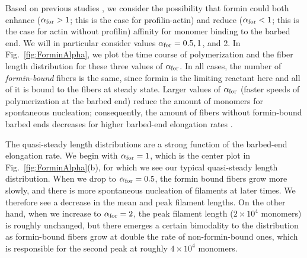 \documentclass[11pt]{article}
\begin{document}
Based on previous studies \cite{zweifel2021nucleation, funk2019profilin}, we consider the possibility that formin could both enhance ($\alpha_\text{for} > 1$; this is the case for profilin-actin) and reduce ($\alpha_\text{for} < 1$; this is the case for actin without profilin) affinity for monomer binding to the barbed end. We will in particular consider values $\alpha_\text{for}=0.5, 1$, and 2. In Fig.\ \ref{fig:ForminAlpha}, we plot the time course of polymerization and the fiber length distribution for these three values of $\alpha_\text{for}$. In all cases, the number of \emph{formin-bound} fibers is the same, since formin is the limiting reactant here and all of it is bound to the fibers at steady state. Larger values of $\alpha_\text{for}$ (faster speeds of polymerization at the barbed end) reduce the amount of monomers for spontaneous nucleation; consequently, the amount of fibers without formin-bound barbed ends decreases for higher barbed-end elongation rates \cite{banerjee2022emergence}.

The quasi-steady length distributions are a strong function of the barbed-end elongation rate. We begin with $\alpha_\text{for}=1$, which is the center plot in Fig.\ \ref{fig:ForminAlpha}(b), for which we see our typical quasi-steady length distribution. When we drop to $\alpha_\text{for}=0.5$, the formin bound fibers grow more slowly, and there is more spontaneous nucleation of filaments at later times. We therefore see a decrease in the mean and peak filament lengths. On the other hand, when we increase to $\alpha_\text{for}=2$, the peak filament length ($2 \times 10^4$ monomers) is roughly unchanged, but there emerges a certain bimodality to the distribution as formin-bound fibers grow at double the rate of non-formin-bound ones, which is responsible for the second peak at roughly $4 \times 10^4$ monomers.
\end{document}
